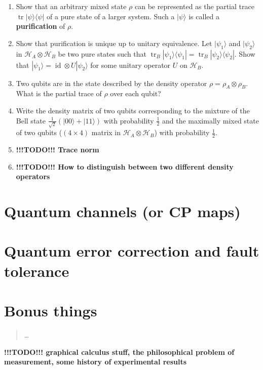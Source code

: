 \documentclass{article}
\begin{document}
\begin{enumerate}
\def\labelenumi{\arabic{enumi}.}
\item
  Show that an arbitrary mixed state \(\rho\) can be represented as the partial trace \(\operatorname{tr}|\psi\rangle\langle\psi|\) of a pure state of a larger system.
  Such a \(|\psi\rangle\) is called a \textbf{purification} of \(\rho\).
\item
  Show that purification is unique up to unitary equivalence.
  Let \(|\psi_1\rangle\) and \(|\psi_2\rangle\) in \(\mathcal{H}_A\otimes\mathcal{H}_B\) be two pure states such that \(\operatorname{tr}_B|\psi_1\rangle\langle\psi_1| = \operatorname{tr}_B|\psi_2\rangle\langle\psi_2|\).
  Show that \(|\psi_1\rangle = \operatorname{id}\otimes U|\psi_2\rangle\) for some unitary operator \(U\) on \(\mathcal{H}_B\).
\item
  Two qubits are in the state described by the density operator \(\rho = \rho_A\otimes\rho_B\).
  What is the partial trace of \(\rho\) over each qubit?
\item
  Write the density matrix of two qubits corresponding to the mixture of the Bell state \(\frac{1}{\sqrt 2}\left(|00\rangle + |11\rangle\right)\) with probability \(\frac12\) and the maximally mixed state of two qubits (\((4\times 4)\) matrix in \(\mathcal{H}_A\otimes\mathcal{H}_B\)) with probability \(\frac12\).
\item
  \textbf{!!!TODO!!! Trace norm}
\item
  \textbf{!!!TODO!!! How to distinguish between two different density operators}
\end{enumerate}

\hypertarget{chapter10}{%
\section{Quantum channels (or CP maps)}\label{chapter10}}

\hypertarget{chapter11}{%
\section{Quantum error correction and fault tolerance}\label{chapter11}}

\hypertarget{chapter12}{%
\section{Bonus things}\label{chapter12}}

\begin{quote}
\ldots{}
\end{quote}

\textbf{!!!TODO!!! graphical calculus stuff, the philosophical problem of measurement, some history of experimental results}
\end{document}
